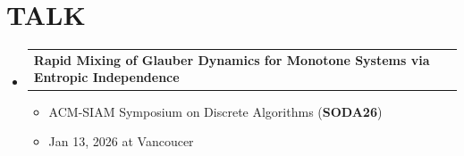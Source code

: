 \documentclass[letterpaper,11pt]{article}
\makeatletter
\newcommand{\resumeItem}[1]{
  \item\small{
    {#1 \vspace{-1pt}}
  }
}
\newcommand{\resumeProjectHeading}[2]{
    \item
    \begin{tabular*}{\textwidth}{l@{\extracolsep{\fill}}r}
      #1 & {\color{dark-grey}} \\
    \end{tabular*}\vspace{-4pt}
}
\newcommand{\resumeSubHeadingListStart}{\begin{itemize}[leftmargin=0in, label={}]}
\newcommand{\resumeSubHeadingListEnd}{\end{itemize}}
\newcommand{\resumeItemListStart}{\begin{itemize}}
\newcommand{\resumeItemListEnd}{\end{itemize}\vspace{0pt}}
\makeatother
\begin{document}
\section{TALK}
    \resumeSubHeadingListStart

        \resumeProjectHeading
          {\textbf{Rapid Mixing of Glauber Dynamics for Monotone Systems via Entropic Independence}}{}
          \resumeItemListStart
            \resumeItem{ACM-SIAM Symposium on Discrete Algorithms (\textbf{SODA26})}
            \resumeItem{Jan 13, 2026 at Vancoucer}
          \resumeItemListEnd
          

    \resumeSubHeadingListEnd

\end{document}
